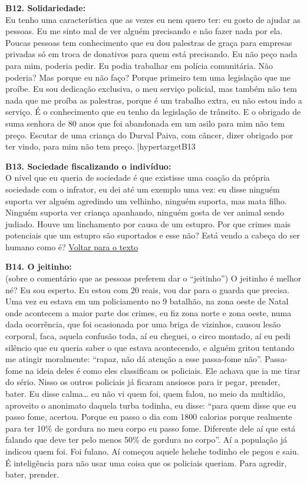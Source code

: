 \documentclass[
	12pt,				%
	openright,			%
	twoside,			%
	a4paper,			%
	chapter=TITLE,		%
	section=TITLE,		%
	subsection=TITLE,	%
	subsubsection=TITLE,%
	spanish,            %
	english,			%
	brazil				%
	]{abntex2}
\begin{document}
\begin{anexosenv}
	\hypertarget{B12}{}
	\par
	\textbf{B12. Solidariedade:} \\
	Eu tenho uma característica que as vezes eu nem quero ter: eu gosto de ajudar as pessoas. Eu me sinto mal de ver alguém precisando e não fazer nada por ela. Poucas pessoas tem conhecimento que eu dou palestras de graça para empresas privadas só em troca de donativos para quem está precisando. Eu não peço nada para mim, poderia pedir. Eu podia trabalhar em polícia comunitária. Não poderia? Mas porque eu não faço? Porque primeiro tem uma legislação que me proíbe. Eu sou dedicação exclusiva, o meu serviço policial, mas também não tem nada que me proíba as palestras, porque é um trabalho extra, eu não estou indo a serviço. É o conhecimento que eu tenho da legislação de trânsito. E o obrigado de suma senhora de 80 anos que foi abandonada em um asilo para mim não tem preço. Escutar de uma criança do Durval Paiva, com câncer,  dizer obrigado por ter vindo, para mim não tem preço.
	|hypertarget{B13}{}
	\par
	\textbf{B13. Sociedade fiscalizando o indivíduo:}\\
	O nível que eu queria de sociedade é que existisse uma coação da própria sociedade com o infrator, eu dei até um exemplo uma vez: eu disse ninguém suporta ver alguém agredindo um velhinho, ninguém suporta, mas mata filho. Ninguém suporta ver criança apanhando, ninguém gosta de ver animal sendo judiado. Houve um linchamento por causa de um estupro. Por que crimes mais potenciais que um estupro são suportados e esse não? Está vendo a cabeça do ser humano como é?
	\hyperlink{Sty}{Voltar para o texto}
	\hypertarget{(B14)}{} 
	\par
	\textbf{B14. O jeitinho:}\\
	(sobre o comentário que as pessoas preferem dar o “jeitinho”) O jeitinho é melhor né? Eu sou esperto. Eu estou com 20 reais, vou dar para o guarda que precisa. Uma vez eu estava em um policiamento no 9 batalhão, na zona oeste de Natal onde acontecem a maior parte dos crimes, eu fiz zona norte e zona oeste, numa dada ocorrência, que foi ocasionada por uma briga de vizinhos, causou lesão corporal, faca, aquela confusão toda, aí eu cheguei, o circo montado, aí eu pedi silêncio que eu queria saber o que estava acontecendo,   e alguém gritou tentando me atingir moralmente: “rapaz, não dá atenção a esse passa-fome não”. Passa-fome na ideia deles é como eles classificam os policiais. Ele achava que ia me tirar do sério. Nisso os outros policiais já ficaram ansiosos para ir pegar, prender, bater. Eu disse calma… eu não vi quem foi, quem falou, no meio da multidão, aproveito o anonimato daquela turba todinha, eu disse: “para quem disse que eu passo fome, acertou. Porque eu passo o dia com 1800 calorias porque realmente para ter 10\% de gordura no meu corpo eu passo fome. Diferente dele aí que está falando que deve ter pelo menos 50\% de gordura no corpo”. Aí a população já indicou quem foi. Foi fulano. Aí começou aquele hehehe todinho ele pegou e saiu. É inteligência para não usar uma coisa que os policiais queriam. Para agredir, bater, prender.

\end{anexosenv}
\end{document}
